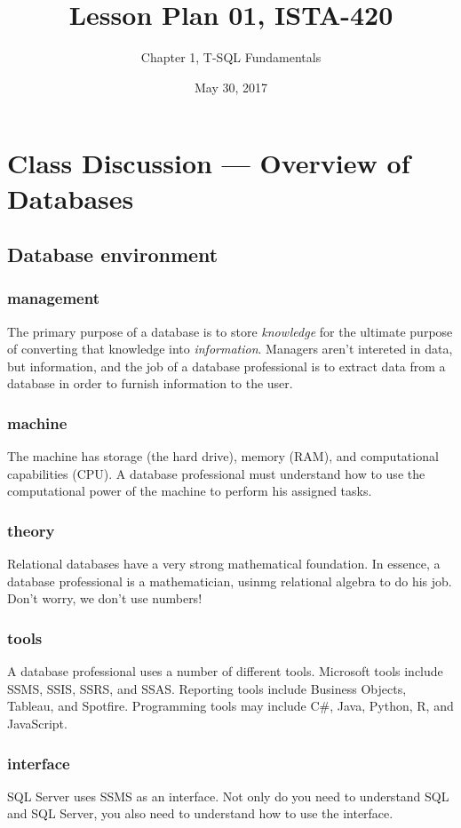 \documentclass{article}
\title{Lesson Plan 01, ISTA-420}
\author{Chapter 1, T-SQL Fundamentals}
\date{May 30, 2017}
\begin{document}
    

    \maketitle{}


    \section{Class Discussion --- Overview of Databases}

        \subsection{Database environment}
            \subsubsection{management}
            The primary purpose of a database is to store \textit{knowledge} for the ultimate purpose of converting that knowledge into \textit{information}. Managers aren't intereted in data, but information, and the job of a database professional is to extract data from a database in order to furnish information to the user.
            \subsubsection{machine}
            The machine has storage (the hard drive), memory (RAM), and computational capabilities (CPU). A database professional must understand how to use the computational power of the machine to perform his assigned tasks.
            \subsubsection{theory}
            Relational databases have a very strong mathematical foundation. In essence, a database professional is a mathematician, usinmg relational algebra to do his job. Don't worry, we don't use numbers!
            \subsubsection{tools}
            A database professional uses a number of different tools. Microsoft tools include SSMS, SSIS, SSRS, and SSAS. Reporting tools include Business Objects, Tableau, and Spotfire. Programming tools may include C\#, Java, Python, R, and JavaScript.
            \subsubsection{interface}
            SQL Server uses SSMS as an interface. Not only do you need to understand SQL and SQL Server, you also need to understand how to use the interface.
\end{document}
